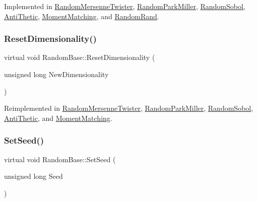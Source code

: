 Implemented in \hyperlink{classRandomMersenneTwister_aac2add88779d014d7722a3bfe9eed219}{Random\+Mersenne\+Twister}, \hyperlink{classRandomParkMiller_a3149e8b0b8f2bba6b389325cd6d61cc0}{Random\+Park\+Miller}, \hyperlink{classRandomSobol_a7a749c87dec7a74d18d22edbb753f65a}{Random\+Sobol}, \hyperlink{classAntiThetic_a54f6452f0017f86580b7af9dfa0172e4}{Anti\+Thetic}, \hyperlink{classMomentMatching_ac1c10b8bc2fc4b8b1564af89725c27ca}{Moment\+Matching}, and \hyperlink{classRandomRand_a27bd392590f772d66ba75781964ff2c9}{Random\+Rand}.

\hypertarget{classRandomBase_a8931e429ae130ea44af5469dc6ae728f}{}\label{classRandomBase_a8931e429ae130ea44af5469dc6ae728f} 
\subsubsection{\texorpdfstring{Reset\+Dimensionality()}{ResetDimensionality()}}
{\footnotesize\ttfamily virtual void Random\+Base\+::\+Reset\+Dimensionality (\begin{DoxyParamCaption}\item[{unsigned long}]{New\+Dimensionality }\end{DoxyParamCaption})\hspace{0.3cm}{\ttfamily [virtual]}}



Reimplemented in \hyperlink{classRandomMersenneTwister_a5fdeed1a2eaabf7b61241b6f850cbaf1}{Random\+Mersenne\+Twister}, \hyperlink{classRandomParkMiller_a2dff7d05b001445fe8e322f2bdc98ac7}{Random\+Park\+Miller}, \hyperlink{classRandomSobol_a14db32657f70fcbb0b3847caacddabc2}{Random\+Sobol}, \hyperlink{classAntiThetic_afb5d6c15a5729be709d905d81582e1b7}{Anti\+Thetic}, and \hyperlink{classMomentMatching_abf820b373aed3833b07408c53862f69b}{Moment\+Matching}.

\hypertarget{classRandomBase_ae93f26c38d1675ef07cb1fd29b894b26}{}\label{classRandomBase_ae93f26c38d1675ef07cb1fd29b894b26} 
\subsubsection{\texorpdfstring{Set\+Seed()}{SetSeed()}}
{\footnotesize\ttfamily virtual void Random\+Base\+::\+Set\+Seed (\begin{DoxyParamCaption}\item[{unsigned long}]{Seed }\end{DoxyParamCaption})\hspace{0.3cm}{\ttfamily [pure virtual]}}



